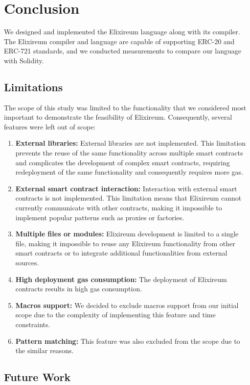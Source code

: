 \chapter{Conclusion}

We designed and implemented the Elixireum language along with its compiler. The Elixireum compiler and language are capable of supporting ERC-20 and ERC-721 standards, and we conducted measurements to compare our language with Solidity.

\section{Limitations}

The scope of this study was limited to the functionality that we considered most important to demonstrate the feasibility of Elixireum. Consequently, several features were left out of scope:

\begin{enumerate}
\item \textbf{External libraries:} External libraries are not implemented. This limitation prevents the reuse of the same functionality across multiple smart contracts and complicates the development of complex smart contracts, requiring redeployment of the same functionality and consequently requires more gas.
\item \textbf{External smart contract interaction:} Interaction with external smart contracts is not implemented. This limitation means that Elixireum cannot currently communicate with other contracts, making it impossible to implement popular patterns such as proxies or factories.
\item \textbf{Multiple files or modules:} Elixireum development is limited to a single file, making it impossible to reuse any Elixireum functionality from other smart contracts or to integrate additional functionalities from external sources.
\item \textbf{High deployment gas consumption:} The deployment of Elixireum contracts results in high gas consumption.
\item \textbf{Macros support:} We decided to exclude macros support from our initial scope due to the complexity of implementing this feature and time constraints.
\item \textbf{Pattern matching:} This feature was also excluded from the scope due to the similar reasons.
\end{enumerate}

\section{Future Work}

